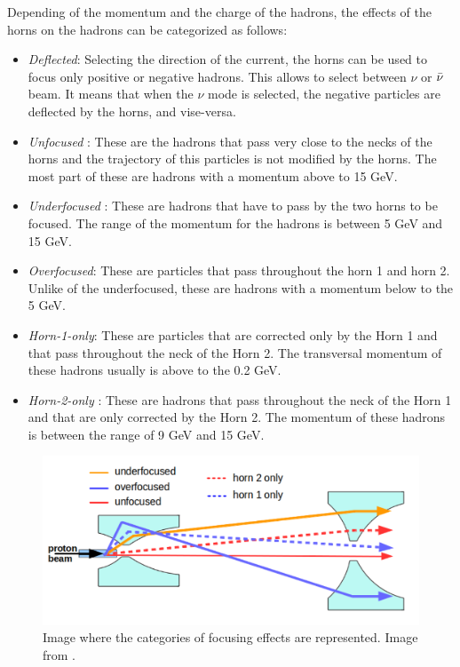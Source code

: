 Depending of the momentum and the charge of the hadrons, the effects of the horns on the hadrons can be categorized as follows:

\begin{itemize}
    \item \textit{Deflected}: Selecting the direction of the current, the horns can be used to focus only positive or negative hadrons. This allows to select between $\nu$ or $\Bar{\nu}$ beam. It means that when the $\nu$ mode is selected, the negative particles are deflected by the horns, and vise-versa.
    \item \textit{Unfocused} : These are the hadrons that pass very close to the necks of the horns and the trajectory of this particles is not modified by the horns. The most part of these are hadrons with a momentum above to 15 GeV. 
    \item \textit{Underfocused} : These are hadrons that have to pass by the two horns to be focused. The range of the momentum for the hadrons is between 5 GeV and 15 GeV.
    \item \textit{Overfocused}: These are particles that pass throughout the horn 1 and horn 2. Unlike of the underfocused, these are hadrons with a momentum below to the 5 GeV. 
    \item \textit{Horn-1-only}: These are particles that are corrected only by the Horn 1 and that pass throughout the neck of the Horn 2. The transversal momentum of these hadrons usually is above to the 0.2 GeV.
    \item \textit{Horn-2-only} : These are hadrons that pass throughout the neck of the Horn 1 and that are only corrected by the Horn 2. The momentum of these hadrons is between the range of 9 GeV and 15 GeV.
\end{itemize}

\begin{figure}[!htb]
\centering
\includegraphics[scale=0.33]{Figures/Chapter2/FocusingComponents.png}
        \caption{Image where the categories of focusing effects are represented. Image from \cite{LeoThesis}.} 
\label{fig:MnvExp:NuMI:NuMIFocusingComponents}
\end{figure}

